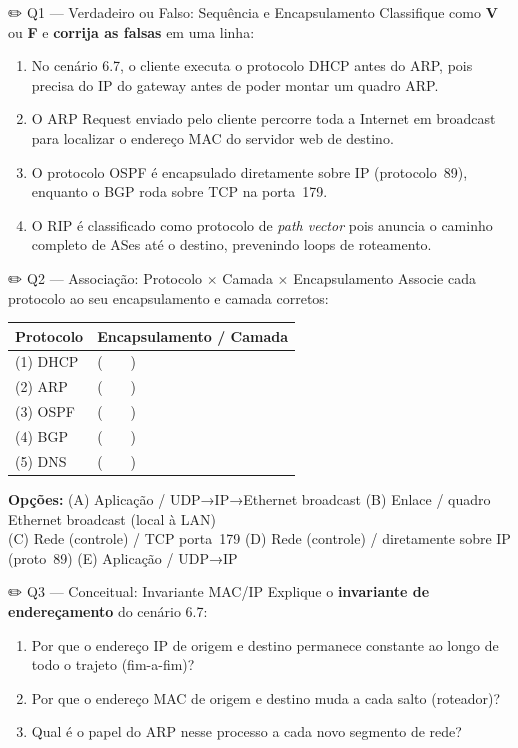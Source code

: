 \documentclass[11pt,a4paper]{article}
\begin{document}
\begin{questao}{✏️ Q1 --- Verdadeiro ou Falso: Sequência e Encapsulamento}
Classifique como \textbf{V} ou \textbf{F} e \textbf{corrija as falsas} em uma linha:
\begin{enumerate}[label=(\alph*)]
    \item No cenário 6.7, o cliente executa o protocolo DHCP antes do ARP, pois precisa do IP do gateway antes de poder montar um quadro ARP.
    \item O ARP Request enviado pelo cliente percorre toda a Internet em broadcast para localizar o endereço MAC do servidor web de destino.
    \item O protocolo OSPF é encapsulado diretamente sobre IP (protocolo~89), enquanto o BGP roda sobre TCP na porta~179.
    \item O RIP é classificado como protocolo de \textit{path vector} pois anuncia o caminho completo de ASes até o destino, prevenindo loops de roteamento.
\end{enumerate}
\end{questao}

\begin{questao}{✏️ Q2 --- Associação: Protocolo $\times$ Camada $\times$ Encapsulamento}
Associe cada protocolo ao seu encapsulamento e camada corretos:

\begin{center}
\begin{tabular}{ll}
\toprule
\textbf{Protocolo} & \textbf{Encapsulamento / Camada} \\
\midrule
(1) DHCP & (~~~~) \\
(2) ARP  & (~~~~) \\
(3) OSPF & (~~~~) \\
(4) BGP  & (~~~~) \\
(5) DNS  & (~~~~) \\
\bottomrule
\end{tabular}
\end{center}

\textbf{Opções:}
(A) Aplicação / UDP→IP→Ethernet broadcast \quad
(B) Enlace / quadro Ethernet broadcast (local à LAN) \\
(C) Rede (controle) / TCP porta~179 \quad
(D) Rede (controle) / diretamente sobre IP (proto~89) \quad
(E) Aplicação / UDP→IP
\end{questao}

\begin{questao}{✏️ Q3 --- Conceitual: Invariante MAC/IP}
Explique o \textbf{invariante de endereçamento} do cenário 6.7:
\begin{enumerate}[label=(\alph*)]
    \item Por que o endereço IP de origem e destino permanece constante ao longo de todo o trajeto (fim-a-fim)?
    \item Por que o endereço MAC de origem e destino muda a cada salto (roteador)?
    \item Qual é o papel do ARP nesse processo a cada novo segmento de rede?
\end{enumerate}
\end{questao}
\end{document}
